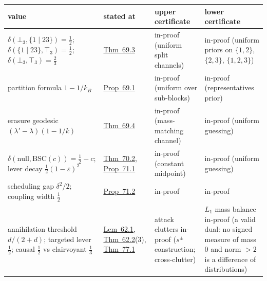 {\def\LTcaptype{none} %
\begin{longtable}[]{@{}
  >{\raggedright\arraybackslash}p{}
  >{\raggedright\arraybackslash}p{}
  >{\raggedright\arraybackslash}p{}
  >{\raggedright\arraybackslash}p{}@{}}
\toprule\noalign{}
\begin{minipage}[b]{\linewidth}\raggedright
value
\end{minipage} & \begin{minipage}[b]{\linewidth}\raggedright
stated at
\end{minipage} & \begin{minipage}[b]{\linewidth}\raggedright
upper certificate
\end{minipage} & \begin{minipage}[b]{\linewidth}\raggedright
lower certificate
\end{minipage} \\
\midrule\noalign{}
\endhead
\bottomrule\noalign{}
\endlastfoot
\(\delta(\bot_3, \{1\!\mid\!23\}) = \tfrac12\); \(\delta(\{1\!\mid\!23\}, \top_3) = \tfrac12\); \(\delta(\bot_3, \top_3) = \tfrac23\) & \hyperlink{stmt:69.3}{Thm~69.3} & in-proof (uniform split channels) & in-proof (uniform priors on \(\{1,2\}\), \(\{2,3\}\), \(\{1,2,3\}\)) \\
partition formula \(1 - 1/k_B\) & \hyperlink{stmt:69.1}{Prop~69.1} & in-proof (uniform over sub-blocks) & in-proof (representatives prior) \\
erasure geodesic \((\lambda' - \lambda)(1 - 1/k)\) & \hyperlink{stmt:69.4}{Thm~69.4} & in-proof (mass-matching channel) & in-proof (uniform guessing) \\
\(\delta(\text{null}, \mathrm{BSC}(c)) = \tfrac12 - c\); lever decay \(\tfrac12(1-\varepsilon)^2\) & \hyperlink{stmt:70.2}{Thm~70.2}, \hyperlink{stmt:71.1}{Prop~71.1} & in-proof (constant midpoint) & in-proof (uniform guessing) \\
scheduling gap \(\delta^2/2\); coupling width \(\tfrac12\) & \hyperlink{stmt:71.2}{Prop~71.2} & in-proof & in-proof \\
annihilation threshold \(d/(2+d)\); targeted lever \(\tfrac12\); causal \(\tfrac12\) vs clairvoyant \(\tfrac13\) & \hyperlink{stmt:62.1}{Lem~62.1}, \hyperlink{stmt:62.2}{Thm~62.2}(3), \hyperlink{stmt:77.1}{Thm~77.1} & attack clutters in-proof (\(s^\pm\) construction; cross-clutter) & \(L_1\) mass balance in-proof (a valid dual: no signed measure of mass \(0\) and norm \(> 2\) is a difference of distributions) \\

\end{longtable}}
